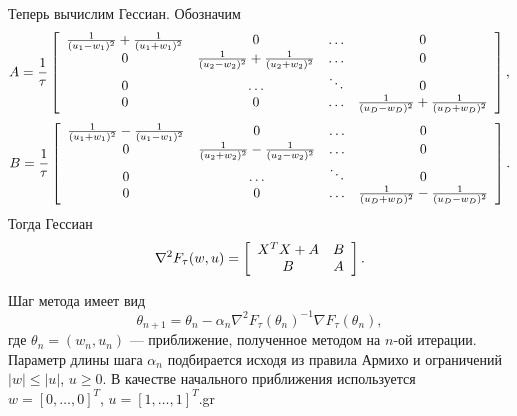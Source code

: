 \documentclass[12pt]{article}
\begin{document}
		Теперь вычислим Гессиан. Обозначим 
		$$A = \frac 1 \tau \left [
		\begin{array}[l]{cccc}
			\frac 1 {(u_1 - w_1)^2} + \frac 1 {(u_1 + w_1)^2}& 0 &\ldots & 0 \\
			0 & \frac 1 {(u_2 - w_2)^2} + \frac 1 {(u_2 + w_2)^2} &\ldots & 0 \\
			0 &\ldots & \ddots  & 0\\
			0 & 0 & \ldots & \frac 1 {(u_D - w_D)^2} + \frac 1 {(u_D + w_D)^2}\\
		\end{array} \right ], $$
		$$B = \frac 1 \tau \left [
		\begin{array}[l]{cccc}
			\frac 1 {(u_1 + w_1)^2} - \frac 1 {(u_1 - w_1)^2}& 0 &\ldots & 0 \\
			0 & \frac 1 {(u_2 + w_2)^2} - \frac 1 {(u_2 - w_2)^2} &\ldots & 0 \\
			0 &\ldots & \ddots  & 0\\
			0 & 0 & \ldots & \frac 1 {(u_D + w_D)^2} - \frac 1 {(u_D - w_D)^2}\\
		\end{array} \right ].
		$$
		Тогда Гессиан 
		\begin{equation}\label{primal_hessian}
		\nabla^2 F_\tau(w, u) = \left [
		\begin{array}[l]{cc}
			X^T X  + A & B\\
			B & A
		\end{array} \right ].
		\end{equation}
		
		Шаг метода имеет вид
		$$\theta_{n+1} = \theta_n - \alpha_n \nabla^2 F_\tau(\theta_n)^{-1} \nabla F_\tau(\theta_n),$$
		где $\theta_n = (w_n, u_n)$ — приближение, полученное методом на $n$-ой итерации.
		Параметр длины шага $\alpha_n$ подбирается исходя из правила Армихо и ограничений $|w| \le |u|$, $u \ge 0$. В качестве начального приближения используется $w = [0, \ldots, 0]^T$, $u = [1, \ldots, 1]^T$.gr
		
\end{document}
